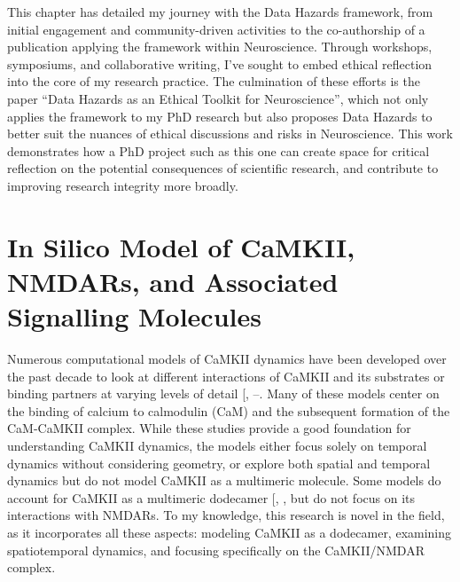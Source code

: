 \documentclass[
  11pt,
  letterpaper,
]{scrreprt}
\begin{document}

This chapter has detailed my journey with the Data Hazards framework,
from initial engagement and community-driven activities to the
co-authorship of a publication applying the framework within
Neuroscience. Through workshops, symposiums, and collaborative writing,
I've sought to embed ethical reflection into the core of my research
practice. The culmination of these efforts is the paper ``Data Hazards
as an Ethical Toolkit for Neuroscience'', which not only applies the
framework to my PhD research but also proposes Data Hazards to better
suit the nuances of ethical discussions and risks in Neuroscience. This
work demonstrates how a PhD project such as this one can create space
for critical reflection on the potential consequences of scientific
research, and contribute to improving research integrity more broadly.


\chapter{In Silico Model of CaMKII, NMDARs, and Associated Signalling
Molecules}\label{sec-model-description}

Numerous computational models of CaMKII dynamics have been developed
over the past decade to look at different interactions of CaMKII and its
substrates or binding partners at varying levels of detail
{[},
--\citeproc{ref-bartol2024Spatial}{436}{]}.
Many of these models center on the binding of calcium to calmodulin
(CaM) and the subsequent formation of the CaM-CaMKII complex. While
these studies provide a good foundation for understanding CaMKII
dynamics, the models either focus solely on temporal dynamics without
considering geometry, or explore both spatial and temporal dynamics but
do not model CaMKII as a multimeric molecule. Some models do account for
CaMKII as a multimeric dodecamer
{[},
,
\citeproc{ref-bartol2024Spatial}{436}{]} but do not focus on its
interactions with NMDARs. To my knowledge, this research is novel in the
field, as it incorporates all these aspects: modeling CaMKII as a
dodecamer, examining spatiotemporal dynamics, and focusing specifically
on the CaMKII/NMDAR complex.
\end{document}

